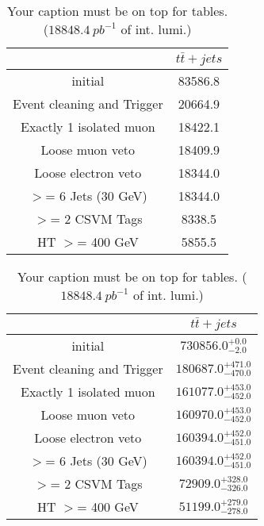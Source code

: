 \documentclass{article}
\begin{document}
\begin{table}
\caption{Your caption must be on top for tables. ($18848.4~pb^{-1}$ of int. lumi.)}
\label{tab:}
\centering
\begin{tabular}{|c|c|}
\toprule
&$t\bar{t}+jets$	\\

\midrule
initial&	83586.8	\\

Event cleaning and Trigger&	20664.9	\\

Exactly 1 isolated muon&	18422.1	\\

Loose muon veto&	18409.9	\\

Loose electron veto&	18344.0	\\

$>$= 6 Jets (30 GeV)&	18344.0	\\

$>$= 2 CSVM Tags&	8338.5	\\

HT $>$=  400 GeV&	5855.5	\\

\bottomrule
\end{tabular}
\end{table}
\begin{table}
\caption{Your caption must be on top for tables. ($18848.4~pb^{-1}$ of int. lumi.)}
\label{tab:}
\centering
\begin{tabular}{|c|c|}
\toprule
&$t\bar{t}+jets$	\\

\midrule
initial&	$730856.0^{+0.0}_{-2.0}$	\\

Event cleaning and Trigger&	$180687.0^{+471.0}_{-470.0}$	\\

Exactly 1 isolated muon&	$161077.0^{+453.0}_{-452.0}$	\\

Loose muon veto&	$160970.0^{+453.0}_{-452.0}$	\\

Loose electron veto&	$160394.0^{+452.0}_{-451.0}$	\\

$>$= 6 Jets (30 GeV)&	$160394.0^{+452.0}_{-451.0}$	\\

$>$= 2 CSVM Tags&	$72909.0^{+328.0}_{-326.0}$	\\

HT $>$=  400 GeV&	$51199.0^{+279.0}_{-278.0}$	\\

\bottomrule
\end{tabular}
\end{table}
\end{document}
